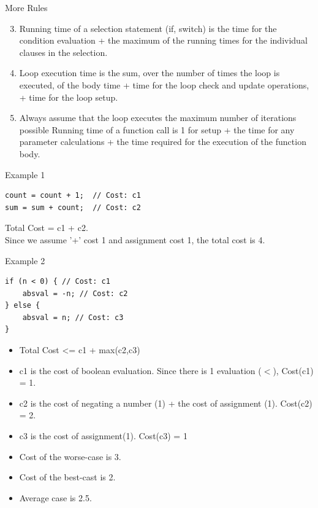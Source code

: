 \documentclass{beamer}
\begin{document}
\begin{frame}{More Rules}
\begin{enumerate}
\setcounter{enumi}{2}
\item Running time of a selection statement (if, switch) is the time for the condition evaluation + the maximum of the running times for the individual clauses in the selection.
\item Loop execution time is the sum, over the number of times the loop is executed, of the body time + time for the loop check and update operations, + time for the loop setup.
\item Always assume that the loop executes the maximum number of iterations possible
Running time of a function call is 1 for setup + the time for any parameter calculations + the time required for the execution of the function body.
\end{enumerate}
\end{frame}

\begin{frame}[fragile]{Example 1}
\begin{lstlisting}
count = count + 1;  // Cost: c1
sum = sum + count;  // Cost: c2 
\end{lstlisting}
Total Cost = c1 + c2. \\
Since we assume '+' cost 1 and assignment cost 1, the total cost is 4.
\end{frame}

\begin{frame}[fragile]{Example 2}
\begin{lstlisting}
if (n < 0) { // Cost: c1
    absval = -n; // Cost: c2
} else {
    absval = n; // Cost: c3
}

\end{lstlisting}
\begin{itemize}
\item Total Cost  <=  c1 + max(c2,c3)
\item c1 is the cost of boolean evaluation.  Since there is 1 evaluation ($<$), Cost(c1) = 1.
\item c2 is the cost of negating a number (1) + the cost of assignment (1).  Cost(c2) = 2.
\item c3 is the cost of assignment(1).  Cost(c3) = 1
\item Cost of the worse-case is 3.
\item Cost of the best-cast is 2.
\item Average case is 2.5.
\end{itemize}
\end{frame}
\end{document}
